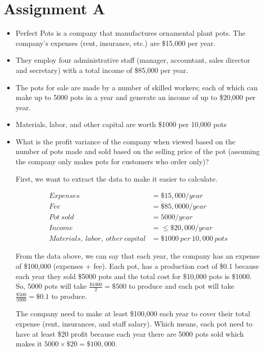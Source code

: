 \documentclass[12pt,titlepage]{article}
\begin{document}
\section*{Assignment A}
\begin{itemize}
    \item Perfect Pots is a company that manufactures ornamental plant pots. The company's expenses (rent, insurance, etc.) are \$15,000 per year.
    \item They employ four administrative staff (manager, accountant, sales director and secretary) with a total income of \$85,000 per year.
    \item The pots for sale are made by a number of skilled workers; each of which can make up to 5000 pots in a year and generate an income of up to \$20,000 per year.
    \item Materials, labor, and other capital are worth \$1000 per 10,000 pots
    \item {
        What is the profit variance of the company when viewed based on the number of pots made and sold based on the selling price of the pot 
        (assuming the company only makes pots for customers who order only)?

        First, we want to extract the data to make it easier to calculate.

        \begin{align*}
            Expenses &= \$15,000/year\\
            Fee &= \$85,0000/year\\
            Pot~sold &= 5000/year\\
            Income &= \leq\$20,000/year\\
            Materials,~labor,~other~capital &= \$1000~per~10,000~pots
        \end{align*}

        From the data above, we can say that each year, the company has an expense of \$100,000 (expenses + fee). Each pot, has 
        a production cost of \$0.1 because each year they sold \$5000 pots and the total cost for \$10,000 pots is \$1000. 
        So, 5000 pots will take $\frac{\$1000}{2}=\$500$ to produce and each pot will take $\frac{\$500}{5000}=\$0.1$ to produce.
        
        The company need to make at least \$100,000 each year to cover their total expense (rent, insurances, and staff salary).
        Which means, each pot need to have at least \$20 profit because each year there are 5000 pots sold which makes it $5000\times\$20=\$100,000$.

}
\end{itemize}
\end{document}
